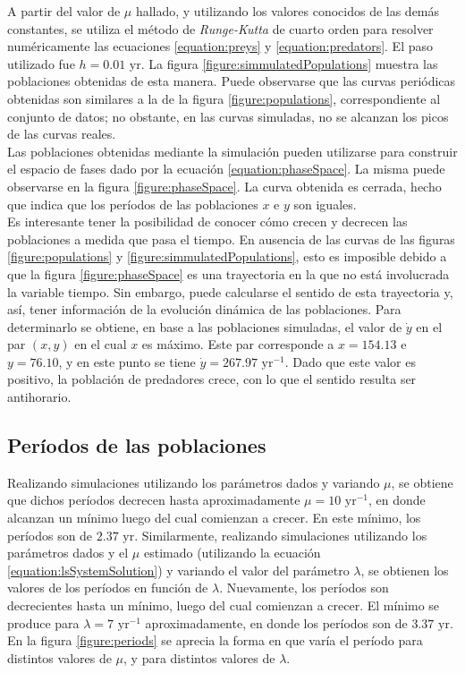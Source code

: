 \documentclass[journal, monochrome]{IEEEtran}
\begin{document}
A partir del valor de $\mu$ hallado, y utilizando los valores conocidos de las demás constantes, se utiliza el método de \textit{Runge-Kutta} de cuarto orden \citep{mathews} para resolver numéricamente las ecuaciones 
\ref{equation:preys} y \ref{equation:predators}. El paso utilizado fue $h = 0.01 \text{ yr}$. La figura \ref{figure:simmulatedPopulations} muestra las poblaciones obtenidas de esta manera. Puede observarse que las curvas periódicas obtenidas 
son similares a la de la figura \ref{figure:populations}, correspondiente al conjunto de datos; no obstante, en las curvas simuladas, no se alcanzan los picos de las curvas reales.\\


Las poblaciones obtenidas mediante la simulación pueden utilizarse para construir el espacio de fases dado por la ecuación \ref{equation:phaseSpace}. La misma puede observarse en la figura \ref{figure:phaseSpace}. 
La curva obtenida es cerrada, hecho que indica que los períodos de las poblaciones $x$ e $y$ son iguales.\\

Es interesante tener la posibilidad de conocer cómo crecen y decrecen las poblaciones a medida que pasa el tiempo. En ausencia de las curvas de las figuras \ref{figure:populations} y 
\ref{figure:simmulatedPopulations}, esto es imposible debido a que la figura \ref{figure:phaseSpace} es una trayectoria en la que no está involucrada la variable tiempo. Sin embargo, 
puede calcularse el sentido de esta trayectoria y, así, tener información de la evolución dinámica de las poblaciones. Para determinarlo se obtiene, en base a las poblaciones simuladas, 
el valor de $\dot{y}$ en el par $(x, y)$ en el cual $x$ es máximo. Este par corresponde a $x = 154.13$ e $y = 76.10$, y en este punto se tiene $\dot{y} = 267.97 \text{ yr}^{-1}$. Dado que este valor es positivo,
la población de predadores crece, con lo que el sentido resulta ser antihorario.

\subsection{Períodos de las poblaciones}

Realizando simulaciones utilizando los parámetros dados y variando $\mu$, se obtiene que
dichos períodos decrecen hasta aproximadamente $\mu = 10 \text{ yr}^{-1}$, en donde alcanzan un mínimo luego del cual comienzan a crecer. En este mínimo, los períodos son de $2.37 \text{ yr}$. 
Similarmente, realizando simulaciones utilizando los parámetros dados y el $\mu$ estimado (utilizando la ecuación \ref{equation:lsSystemSolution}) y variando el valor del parámetro $\lambda$, se obtienen
los valores de los períodos en función de $\lambda$. Nuevamente, los períodos son decrecientes hasta un mínimo, luego del cual comienzan a crecer. El mínimo se produce para $\lambda = 7 \text{ yr}^{-1}$
aproximadamente, en donde los períodos son de $3.37 \text{ yr}$. En la figura \ref{figure:periods} se aprecia la forma en que varía el período para distintos valores de $\mu$, y para distintos valores de $\lambda$.
\end{document}
